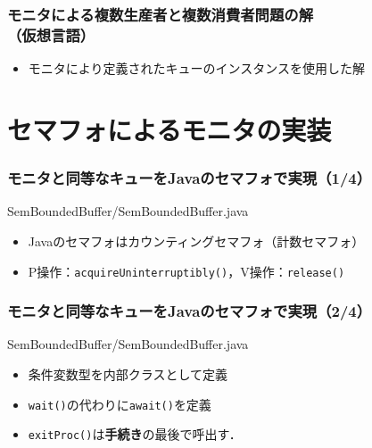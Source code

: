 \documentclass[unicode,handout]{beamer}                   %
\begin{document}
\begin{frame}
  \frametitle{モニタによる複数生産者と複数消費者問題の解\\（仮想言語）}

  \begin{itemize}
  \item モニタにより定義されたキューのインスタンスを使用した解
  \end{itemize}
\end{frame}


\section{セマフォによるモニタの実装}
\begin{frame}
  \frametitle{モニタと同等なキューをJavaのセマフォで実現（1/4）}
      {SemBoundedBuffer/SemBoundedBuffer.java}

  \begin{itemize}
  \item Javaのセマフォはカウンティングセマフォ（計数セマフォ）
  \item P操作：{\tt acquireUninterruptibly()}，V操作：{\tt release()}
  \end{itemize}
\end{frame}

\begin{frame}
  \frametitle{モニタと同等なキューをJavaのセマフォで実現（2/4）}
      {SemBoundedBuffer/SemBoundedBuffer.java}

  \begin{itemize}
  \item 条件変数型を内部クラスとして定義
  \item {\tt wait()}の代わりに{\tt await()}を定義
  \item {\tt exitProc()}は{\bf 手続き}の最後で呼出す．
  \end{itemize}
\end{frame}
\end{document}
